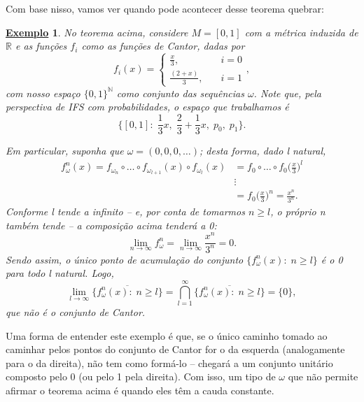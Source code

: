 \documentclass[12pt]{article}
\newtheorem{example}{\underline{Exemplo}}
\theoremstyle{definition}
\begin{document}
Com base nisso, vamos ver quando pode acontecer desse teorema quebrar:
\begin{example}
	No teorema acima, considere \(M=[0,1]\) com a métrica induzida de \(\mathbb{R}\) e as funções \(f_{i}\) como as funções de Cantor, dadas por
	\[
		f_{i}(x) = \left\{\begin{array}{ll}
			\frac{x}{3},     & \quad i=0 \\
			\frac{(2+x)}{3}, & \quad i=1
		\end{array}\right.,
	\]
	com nosso espaço \(\{0,1\}^{\mathbb{N}}\) como conjunto das sequências \(\omega \). Note que, pela perspectiva de IFS com probabilidades, o espaço que trabalhamos é
	\[
		\biggl\{[0, 1]:\; \frac{1}{3}x,\; \frac{2}{3} + \frac{1}{3}x,\; p_{0},\; p_1\biggr\}.
	\]

	Em particular, suponha que \(\omega =(0,0,0,\dotsc )\); desta forma, dado l natural,
	\begin{align*}
		f_{\omega }^{n}(x)=f_{\omega_{n}}\circ \dotsc \circ f_{\omega_{l+1}}(x)\circ f_{\omega_{l}}(x) & =f_{0}\circ \dotsc \circ f_{0}\biggl(\frac{x}{3}\biggr)^{l} \\
		                                                                                               & \vdots                                                      \\
		                                                                                               & =f_{0}\biggl(\frac{x}{3}\biggr)^{n} = \frac{x^{n}}{3^{n}}.
	\end{align*}
	Conforme l tende a infinito -- e, por conta de tomarmos \(n\geq l\), o próprio n também tende -- a composição acima tenderá a 0:
	\[
		\lim_{n\to \infty}f_{\omega}^{n} = \lim_{n\to \infty}\frac{x^{n}}{3^{n}}= 0.
	\]
	Sendo assim, o único ponto de acumulação do conjunto \(\{f_{\omega }^{n}(x):\; n\geq l\}\) é o 0 para todo l natural. Logo,
	\[
		\lim_{l\to \infty}\overline{\{f_{\omega }^{n}(x):\; n\geq l\}}=\bigcap_{l=1}^{\infty}\overline{\{f_{\omega }^{n}(x):\; n\geq l\}}=\{0\},
	\]
	que não é o conjunto de Cantor.
\end{example}
Uma forma de entender este exemplo é que, se o único caminho tomado ao caminhar pelos pontos do conjunto de Cantor for o da esquerda (analogamente para o da direita), não tem como formá-lo -- chegará a um conjunto unitário composto pelo 0 (ou pelo 1 pela direita). Com isso, um tipo de \(\omega \) que não permite afirmar o teorema acima é quando eles têm a cauda constante.
\end{document}
